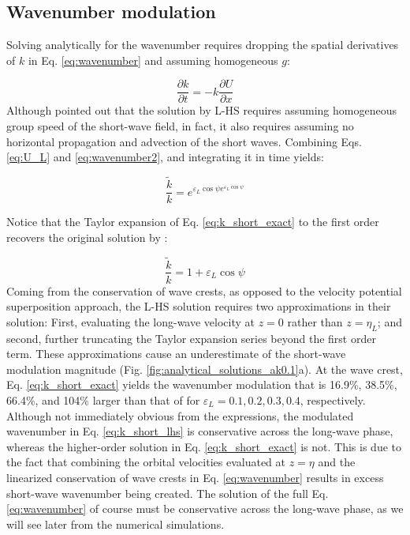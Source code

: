 \documentclass[lineno]{jfm}
\begin{document}
\subsection{Wavenumber modulation}
\label{subsection:wavenumber_modulation}

Solving analytically for the wavenumber requires dropping the spatial derivatives
of $k$ in Eq. \ref{eq:wavenumber} and assuming homogeneous $g$:

\begin{equation}
\label{eq:wavenumber2}
\dfrac{\partial k}{\partial t}
= - k \dfrac{\partial U}{\partial x}
\end{equation}
Although \citet{peureux2021unsteady} pointed out that the solution by L-HS
requires assuming homogeneous group speed of the short-wave field, in fact,
it also requires assuming no horizontal propagation and advection of the short
waves.
Combining Eqs. \ref{eq:U_L} and \ref{eq:wavenumber2}, and integrating it in time
yields:

\begin{equation}
\label{eq:k_short_exact}
\frac{\widetilde{k}}{k} = e^{\varepsilon_L \cos{\psi} e^{\varepsilon_L \cos{\psi}}}
\end{equation}

Notice that the Taylor expansion of Eq. \ref{eq:k_short_exact} to the first order
recovers the original solution by \citet{longuet1960changes}:

\begin{equation}
\label{eq:k_short_lhs}
\frac{\widetilde{k}}{k} = 1 + \varepsilon_L \cos{\psi}
\end{equation}
Coming from the conservation of wave crests, as opposed to the velocity potential
superposition approach, the L-HS solution requires two approximations in their
solution:
First, evaluating the long-wave velocity at $z = 0$ rather than $z = \eta_L$; and
second, further truncating the Taylor expansion series beyond the first order term.
These approximations cause an underestimate of the short-wave modulation
magnitude (Fig. \ref{fig:analytical_solutions_ak0.1}a).
At the wave crest, Eq. \ref{eq:k_short_exact} yields the wavenumber modulation
that is 16.9\%, 38.5\%, 66.4\%, and 104\% larger than that of \citet{longuet1960changes}
for $\varepsilon_L = 0.1, 0.2, 0.3, 0.4$, respectively.
Although not immediately obvious from the expressions, the modulated wavenumber
in Eq. \ref{eq:k_short_lhs} is conservative across the long-wave phase, whereas
the higher-order solution in Eq. \ref{eq:k_short_exact} is not.
This is due to the fact that combining the orbital velocities evaluated at
$z=\eta$ and the linearized conservation of wave crests in Eq. \ref{eq:wavenumber}
results in excess short-wave wavenumber being created.
The solution of the full Eq. \ref{eq:wavenumber} of course must be conservative
across the long-wave phase, as we will see later from the numerical simulations.
\end{document}
